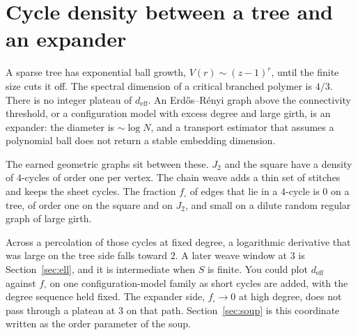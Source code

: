 \section{Cycle density between a tree and an expander}
\label{sec:h-soup}

A sparse tree has exponential ball growth,
\(V(r)\sim (z-1)^r\), until the finite size cuts it off.
The spectral dimension of a critical branched polymer is \(4/3\).
There is no integer plateau of \(d_{\mathrm{eff}}\).
An Erd\H{o}s--R\'enyi graph above the connectivity threshold, or a
configuration model with excess degree and large girth, is an expander:
the diameter is \(\sim\log N\), and a transport estimator that assumes a
polynomial ball does not return a stable embedding dimension.

The earned geometric graphs sit between these.
\(J_2\) and the square have a density of \(4\)-cycles of order one per
vertex.
The chain weave adds a thin set of stitches and keeps the sheet cycles.
The fraction \(f_\square\) of edges that lie in a \(4\)-cycle is \(0\) on a
tree, of order one on the square and on \(J_2\), and small on a dilute
random regular graph of large girth.

Across a percolation of those cycles at fixed degree, a logarithmic
derivative that was large on the tree side falls toward \(2\).
A later weave window at \(3\) is Section~\ref{sec:ell}, and it is
intermediate when \(S\) is finite.
You could plot \(d_{\mathrm{eff}}\) against \(f_\square\) on one
configuration-model family as short cycles are added, with the degree
sequence held fixed.
The expander side, \(f_\square\to 0\) at high degree, does not pass
through a plateau at \(3\) on that path.
Section~\ref{sec:soup} is this coordinate written as the order parameter
of the soup.
